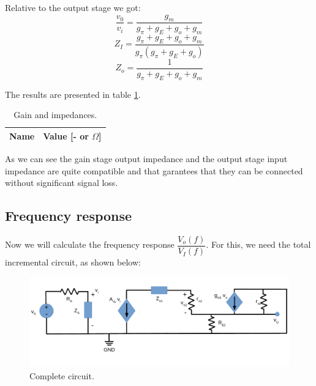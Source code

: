 Relative to the output stage we got:
\begin{equation}
    \dfrac{v_{0}}{v_{i}}=\dfrac{g_{m}}{g_{\pi }+g_{E}+g_{o}+g_{m}}
\end{equation}
\begin{equation}
    Z_{I}=\dfrac{g_{\pi }+g_{E}+g_{o}+g_{m}}{g_{\pi} \left( g_{\pi} +g_{E}+g_{o}\right) }
\end{equation}
\begin{equation}
    Z_{o}=\dfrac{1}{g_{\pi }+g_{E}+g_{o}+g_{m}}
\end{equation}

\clearpage

The results are presented in table \ref{tab:stage2_tab}.
\begin{table}[h]
    \centering
    \begin{tabular}{|l|r|}
      \hline
      {\bf Name} & {\bf Value [- or $\Omega$]} \\ \hline
      
    \end{tabular}
    \caption{Gain and impedances.}
    \label{tab:stage2_tab}
\end{table}

As we can see the gain stage output impedance and the output stage input impedance are quite compatible
and that garantees that they can be connected without significant signal loss.

\subsection{Frequency response}

Now we will calculate the frequency response $\dfrac{V_{o}(f)}{V_{I}(f)}$. For this, we need the total incremental circuit, as shown below:

\begin{figure}[H] \centering
    \includegraphics[scale=0.55]{lab4_AC_Total.pdf}
    \caption{Complete circuit.}
    \label{fig:CompleteCircuit}
\end{figure}
 
